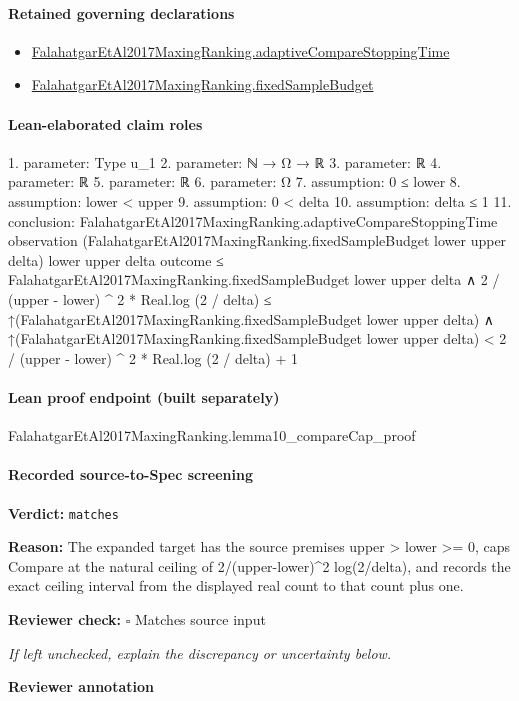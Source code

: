 \documentclass[10pt]{article}
\newcommand{\reviewerbox}{%
  \par\noindent\fbox{\parbox{0.96\linewidth}{\rule{0pt}{0.38in}}}\par
}
\newcommand{\reviewmatch}[1]{%
  \par\noindent\textbf{Reviewer check:} $\square$\; #1\par
  \noindent\emph{If left unchecked, explain the discrepancy or uncertainty below.}\par
}
\begin{document}
\paragraph{Retained governing declarations}
\begin{itemize}\raggedright
\item \hyperlink{governing-declaration-ecdbc5b05a16f3c0}{Falahatgar\allowbreak{}Et\allowbreak{}Al2017\allowbreak{}Maxing\allowbreak{}Ranking.\allowbreak{}adaptive\allowbreak{}Compare\allowbreak{}Stopping\allowbreak{}Time}
\item \hyperlink{governing-declaration-4b4daf4bb2493573}{Falahatgar\allowbreak{}Et\allowbreak{}Al2017\allowbreak{}Maxing\allowbreak{}Ranking.\allowbreak{}fixed\allowbreak{}Sample\allowbreak{}Budget}
\end{itemize}
\paragraph{Lean-elaborated claim roles}\begin{ReviewVerbatim}
1. parameter: Type u_1
2. parameter: ℕ → Ω → ℝ
3. parameter: ℝ
4. parameter: ℝ
5. parameter: ℝ
6. parameter: Ω
7. assumption: 0 ≤ lower
8. assumption: lower < upper
9. assumption: 0 < delta
10. assumption: delta ≤ 1
11. conclusion: FalahatgarEtAl2017MaxingRanking.adaptiveCompareStoppingTime observation
      (FalahatgarEtAl2017MaxingRanking.fixedSampleBudget lower upper delta) lower upper delta outcome ≤
    FalahatgarEtAl2017MaxingRanking.fixedSampleBudget lower upper delta ∧
  2 / (upper - lower) ^ 2 * Real.log (2 / delta) ≤
      ↑(FalahatgarEtAl2017MaxingRanking.fixedSampleBudget lower upper delta) ∧
    ↑(FalahatgarEtAl2017MaxingRanking.fixedSampleBudget lower upper delta) <
      2 / (upper - lower) ^ 2 * Real.log (2 / delta) + 1
\end{ReviewVerbatim}

\paragraph{Lean proof endpoint (built separately)}\begin{ReviewVerbatim}
FalahatgarEtAl2017MaxingRanking.lemma10_compareCap_proof
\end{ReviewVerbatim}

\paragraph{Recorded source-to-Spec screening}
\textbf{Verdict:} \texttt{matches}
\\
{\raggedright
\textbf{Reason:} The expanded target has the source premises upper > lower >= 0, caps Compare at the natural ceiling of 2/\allowbreak{}(upper-\allowbreak{}lower)\textasciicircum{}2 log(2/\allowbreak{}delta), and records the exact ceiling interval from the displayed real count to that count plus one.\allowbreak{}
\par}
\reviewmatch{Matches source input}
\noindent\textbf{Reviewer annotation}\par
\reviewerbox
\clearpage
\hypertarget{source-claim-07ac7de89ff9cdc5}{}
\end{document}
